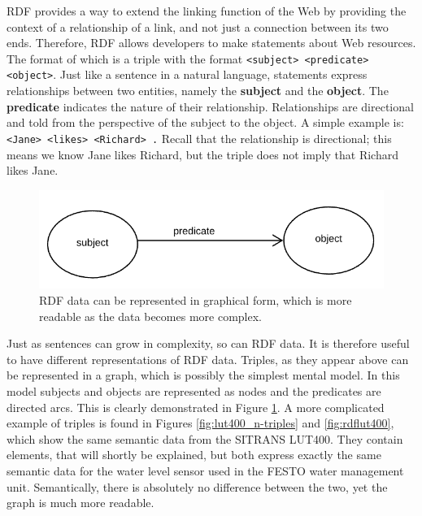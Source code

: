 RDF provides a way to extend the linking function of the Web by providing the context of a relationship of a link, and not just a connection between its two ends. Therefore, RDF allows developers to make statements about Web resources. The format of which is a triple with the format \texttt{<subject> <predicate> <object>}. Just like a sentence in a natural language, statements express relationships between two entities, namely the \textbf{subject} and the \textbf{object}. The \textbf{predicate} indicates the nature of their relationship. Relationships are directional and told from the perspective of the subject to the object. A simple example is: \texttt{<Jane> <likes> <Richard> .} Recall that the relationship is directional; this means we know Jane likes Richard, but the triple does not imply that Richard likes Jane.

\begin{figure}[th]
\centering
\includegraphics[width=.7\textwidth]{Figures/RDFspo.png}
\caption{RDF data can be represented in graphical form, which is more readable as the data becomes more complex.}
\label{fig:RDFspo}
\end{figure}

Just as sentences can grow in complexity, so can RDF data. It is therefore useful to have different representations of RDF data. Triples, as they appear above can be represented in a graph, which is possibly the simplest mental model. In this model subjects and objects are represented as nodes and the predicates are directed arcs. This is clearly demonstrated in Figure \ref{fig:RDFspo}. A more complicated example of triples is found in Figures \ref{fig:lut400_n-triples} and \ref{fig:rdflut400}, which show the same semantic data from the SITRANS LUT400. They contain elements, that will shortly be explained, but both express exactly the same semantic data for the water level sensor used in the FESTO water management unit. Semantically, there is absolutely no difference between the two, yet the graph is much more readable.


